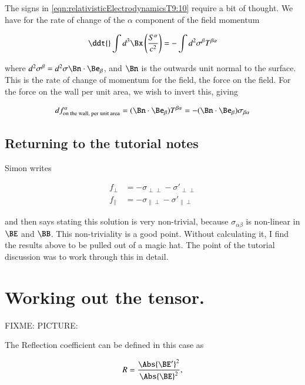 The signs in \ref{eqn:relativisticElectrodynamicsT9:10} require a bit of thought.  We have for the rate of change of the $\alpha$ component of the field momentum

\begin{equation}\label{eqn:relativisticElectrodynamicsT9:11}
\ddt{} \int d^3 \Bx \left( \frac{S^\alpha}{c^2} \right) = - \int d^2 \sigma^\beta T^{\beta \alpha}
\end{equation}

where $d^2 \sigma^\beta = d^2 \sigma \Bn \cdot \Be_\beta$, and $\Bn$ is the outwards unit normal to the surface.  This is the rate of change of momentum for the field, the force on the field.  For the force on the wall per unit area, we wish to invert this, giving

\begin{equation}\label{eqn:relativisticElectrodynamicsT9:500}
df^\alpha_{\text{on the wall, per unit area}}
= (\Bn \cdot \Be_\beta) T^{\beta \alpha}
= -(\Bn \cdot \Be_\beta) \sigma_{\beta \alpha}
\end{equation}

\subsection{Returning to the tutorial notes}

Simon writes

\begin{align}\label{eqn:relativisticElectrodynamicsT9:30}
f_\perp &= - \sigma_{\perp \perp} - {\sigma'}_{\perp \perp} \\
f_\parallel &= - \sigma_{\parallel \perp} - {\sigma'}_{\parallel \perp} 
\end{align}

and then says stating this solution is very non-trivial, because $\sigma_{\alpha \beta}$ is non-linear in $\BE$ and $\BB$.  This non-triviality is a good point.  Without calculating it, I find the results above to be pulled out of a magic hat.  The point of the tutorial discussion was to work through this in detail.

\section{Working out the tensor.}

FIXME: PICTURE: 

The Reflection coefficient can be defined in this case as

\begin{equation}\label{eqn:relativisticElectrodynamicsT9:50}
R = \frac{ \Abs{\BE'}^2 }{ \Abs{\BE}^2 },
\end{equation}

